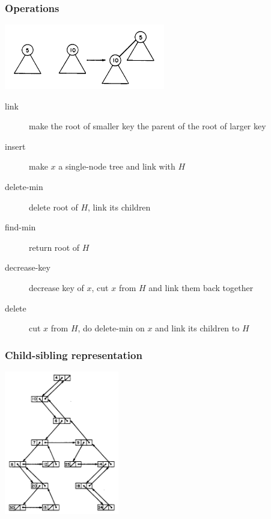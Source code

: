 \documentclass{beamer}
\begin{document}
\begin{frame}
\frametitle{Operations}

\begin{center}
\includegraphics[width=7cm]{../pairing-heap-slides/fig2.png}
\end{center}

\begin{description}
\item[link] make the root of smaller key the parent of the root of larger key
\item[insert] make $x$ a single-node tree and link with $H$
\item[delete-min] delete root of $H$, link its children
\item[find-min] return root of $H$
\item[decrease-key] decrease key of $x$, cut $x$ from $H$ and link them
back together
\item[delete] cut $x$ from $H$, do delete-min on $x$ and link its children to $H$
\end{description}

\end{frame}

\begin{frame}
\frametitle{Child-sibling representation}
\begin{center}
\includegraphics[width=5cm]{../pairing-heap-slides/fig3.png}
\end{center}

\end{frame}
\end{document}
